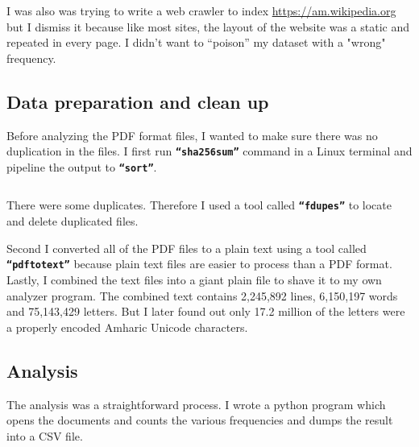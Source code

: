 I was also was trying to write a web crawler to index \url{https://am.wikipedia.org} but I dismiss it because like most sites, the layout of the website was a static and repeated in every page. I didn’t want to “poison” my dataset with a "wrong" frequency.

\subsection{Data preparation and clean up}
Before analyzing the PDF format files, I wanted to make sure there was no duplication in the files. I first run \texttt{\textbf{“sha256sum”}} command in a Linux terminal and pipeline the output to \texttt{\textbf{“sort”}}. 

\inputminted{bash}{codes/sha256-sort.sh}

There were some duplicates. Therefore I used a tool called \texttt{\textbf{“fdupes”}} to locate and delete duplicated files.


Second I converted all of the PDF files to a plain text using a tool called \texttt{\textbf{“pdftotext”}} because plain text files are easier to process than a PDF format. Lastly, I combined the text files into a giant plain file to shave it to my own analyzer program. The combined text contains 2,245,892 lines,  6,150,197 words and 75,143,429 letters. But I later found out only 17.2 million of the letters were a properly encoded Amharic Unicode characters.

\subsection{Analysis}
The analysis was a straightforward process. I wrote a python program which opens the documents and counts the various frequencies and dumps the result into a CSV file.
